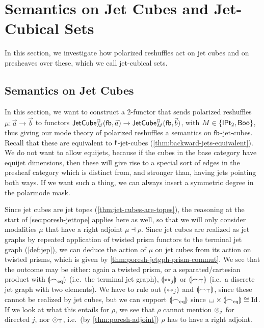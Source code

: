 \documentclass[a4paper]{memoir}
\begin{document}
\section{Semantics on Jet Cubes and Jet-Cubical Sets} \label{sec:poresh-jetcube-jcset}
In this section, we investigate how polarized reshuffles act on jet cubes and on presheaves over these, which we call jet-cubical sets.

\subsection{Semantics on Jet Cubes} \label{sec:poresh-jetcube}
In this section, we want to construct a 2-functor that sends polarized reshuffles $\mu : \vec a \to \vec b$ to functors $\mathsf{JetCube}^{\Box}_{M}({\mathsf{fb}},\vec a) \to \mathsf{JetCube}^{\Box}_{M}({\mathsf{fb}},\vec b)$, with $M \in \mathopen{}\left\{ {\mathsf{IPt}_2}, \mathsf{Boo} \right\}\mathclose{}$, thus giving our mode theory of polarized reshuffles a semantics on ${\mathsf{fb}}$-jet-cubes.
Recall that these are equivalent to ${\mathsf{f}}$-jet-cubes (\cref{thm:backward-jets-equivalent}).
We do not want to allow equijets, because if the cubes in the base category have equijet dimensions, then these will give rise to a special sort of edges in the presheaf category which is distinct from, and stronger than, having jets pointing both ways.
If we want such a thing, we can always insert a symmetric degree in the polarmode mask.

Since jet cubes are jet topes (\cref{thm:jet-cubes-are-topes}), the reasoning at the start of \cref{sec:poresh-jettope} applies here as well, so that we will only consider modalities $\mu$ that have a right adjoint $\mu \dashv \rho$.
Since jet cubes are realized as jet graphs by repeated application of twisted prism functors to the terminal jet graph (\cref{def:jep}), we can deduce the action of $\mu$ on jet cubes from its action on twisted prisms, which is given by \cref{thm:poresh-jetgph-prism-commut}.
We see that the outcome may be either: again a twisted prism, or a separated/cartesian product with ${\llparenthesis {\frown}_{\mathrm{eq}} \rrparenthesis}$ (i.e.\ the terminal jet graph), ${\llparenthesis \leftrightarrowtriangle_j \rrparenthesis}$ or ${\llparenthesis {\frown}_\top \rrparenthesis}$ (i.e.\ a discrete jet graph with two elements).
We have to rule out ${\llparenthesis \leftrightarrowtriangle_j \rrparenthesis}$ and ${\llparenthesis {\frown}_\top \rrparenthesis}$, since these cannot be realized by jet cubes, but we can support ${\llparenthesis {\frown}_{\mathrm{eq}} \rrparenthesis}$ since ${\llcorner\hspace{-.4ex}\lrcorner} \times {\llparenthesis {\frown}_{\mathrm{eq}}\rrparenthesis} \cong \mathrm{Id}$.
If we look at what this entails for $\rho$, we see that $\rho$ cannot mention ${\otimes}_j$ for directed $j$, nor ${\odot}_\top$, i.e.\ (by \cref{thm:poresh-adjoint}) $\rho$ has to have a right adjoint.
\end{document}
